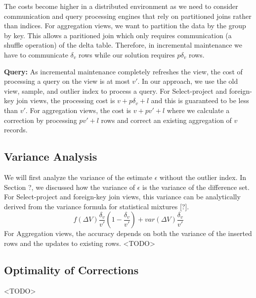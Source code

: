 The costs become higher in a distributed environment as we need to consider communication and query processing engines that rely on partitioned joins rather than indices.
For aggregation views, we want to partition the data by the group by key.
This allows a paritioned join which only requires communication (a shuffle operation) of the delta table.
Therefore, in incremental maintenance we have to communicate $\delta_v$ rows while our solution requires $p\delta_v$ rows.

\textbf{Query: } As incremental maintenance completely refreshes the view, the cost of processing a query on the view is at most $v'$. In our approach, we use the old view, sample, and outlier index to process a query. For Select-project and foreign-key join views, the processing cost is $v + p\delta_v + l$ and this is guaranteed to be less than $v'$. For aggregation views, the cost is $v + pv'+l$ where we calculate a correction by processing $pv'+l$ rows and correct an existing aggregation of $v$ records.

\subsection{Variance Analysis}
We will first analyze the variance of the estimate $\epsilon$ without the outlier index. 
In Section ?, we discussed how the variance of $\epsilon$ is the variance of the difference set.
For Select-project and foreign-key join views, this variance can be analytically derived from the variance formula for statistical mixtures [?].
\begin{equation}
f(\Delta V)\frac{\delta_v}{v'}(1-\frac{\delta_v}{v'})+var(\Delta V)\frac{\delta_v}{v'}
\end{equation}
For Aggregation views, the accuracy depends on both the variance of the inserted rows and the updates to existing rows. 
<TODO>

\subsection{Optimality of Corrections}
<TODO>